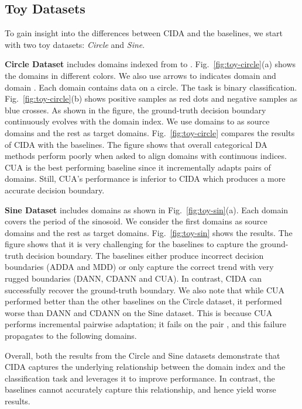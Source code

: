 \documentclass{article}
\newcommand{\figref}[1]{Fig.~\ref{#1}}
\begin{document}
\subsection{Toy Datasets}
To gain insight into the differences between CIDA and the baselines, we start with two toy datasets: \emph{Circle} and \emph{Sine}.


\textbf{Circle Dataset} includes  domains indexed from  to .
\figref{fig:toy-circle}(a) shows the  domains in different colors. We also use arrows to indicates domain  and domain . Each domain contains data on a circle. The task is binary classification. \figref{fig:toy-circle}(b) shows positive samples as red dots and negative samples as blue crosses. As shown in the figure, the ground-truth decision boundary continuously evolves with the domain index. We use domains  to  as source domains and the rest as target domains.
\figref{fig:toy-circle} compares the results of CIDA  with the baselines. The figure shows that overall categorical DA methods perform poorly when asked to align domains with continuous indices. CUA is the best performing baseline since it incrementally adapts  pairs of domains. Still, CUA's performance is inferior to CIDA which produces a more accurate decision boundary.





\textbf{Sine Dataset} includes  domains as shown in \figref{fig:toy-sin}(a). Each domain covers  the period of the sinosoid. We consider the first  domains as source domains and the rest as target domains.
\figref{fig:toy-sin} shows the results. The figure shows that it is very challenging for the baselines to capture the ground-truth decision boundary. The baselines either produce incorrect decision boundaries (ADDA and MDD) or only capture the correct trend with very rugged boundaries (DANN, CDANN and CUA). In contrast, CIDA can successfully recover the ground-truth boundary.
We also note that while CUA  performed better than the other baselines on the Circle dataset, it performed worse than DANN and CDANN on the Sine dataset. This is because CUA performs incremental pairwise adaptation; it fails on the pair , and this failure propagates to the following domains.

Overall, both the results from the Circle and Sine datasets demonstrate that CIDA captures the underlying relationship between the domain index and the classification task and leverages it to improve performance. In contrast, the baselines cannot accurately capture this relationship, and hence yield worse results.
\end{document}
